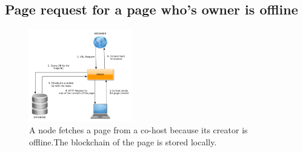 \subsection{Page request for a page who's owner is offline}

\begin{figure}[htp]
\center
\includegraphics[width=0.4\textwidth]{pictures/fetch_page_offline_creator.pdf}
\caption{A node fetches a page from a co-host because its creator is offline.The 
blockchain of the page is stored locally.}
\label{fig:offline_creator}
\end{figure}
